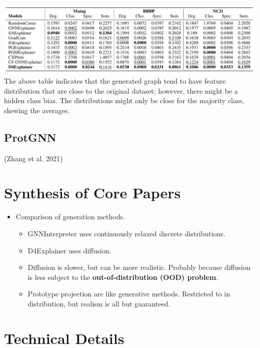 \documentclass[
  11pt,
  letterpaper,
]{article}
\providecommand{\tightlist}{%
  \setlength{\itemsep}{0pt}\setlength{\parskip}{0pt}}\usepackage{longtable,booktabs,array}
\begin{document}
\begin{itemize}
  \includegraphics{figures/D4-MMD-Table.png} The above table indicates
  that the generated graph tend to have feature distribution that are
  close to the original dataset; however, there might be a hidden class
  bias. The distributions might only be close for the majority class,
  skewing the averages.
\end{itemize}

\hypertarget{protgnn}{%
\subsection{ProtGNN}\label{protgnn}}

(Zhang et al. 2021)

\hypertarget{synthesis-of-core-papers}{%
\section{Synthesis of Core Papers}\label{synthesis-of-core-papers}}

\begin{itemize}
\tightlist
\item
  Comparison of generation methods.

  \begin{itemize}
  \tightlist
  \item
    GNNInterpreter uses continuously relaxed discrete distributions.
  \item
    D4Explainer uses diffusion.
  \item
    Diffusion is slower, but can be more realistic. Probably because
    diffusion is less subject to the \textbf{out-of-distribution (OOD)
    problem}.
  \item
    Prototype projection are like generative methods. Restricted to in
    distribution, but realism is all but guaranteed.
  \end{itemize}
\end{itemize}

\hypertarget{technical-details}{%
\section{Technical Details}\label{technical-details}}
\end{document}
